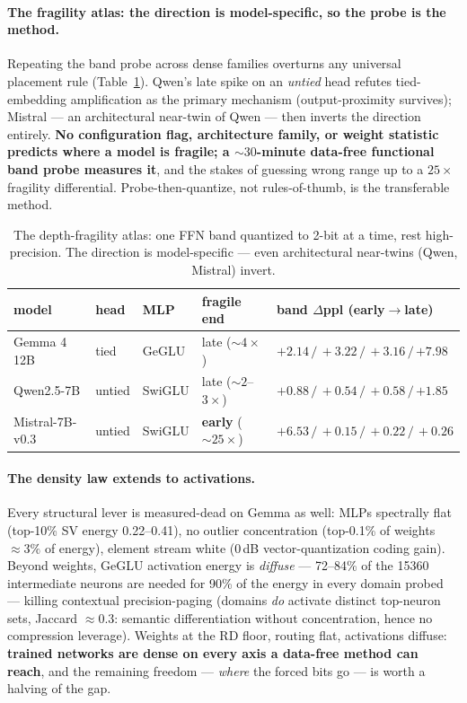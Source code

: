 \documentclass[10pt]{article}
\begin{document}
\paragraph{The fragility atlas: the direction is model-specific, so the probe is the method.}
Repeating the band probe across dense families overturns any universal placement rule
(Table~\ref{tab:atlas}). Qwen's late spike on an \emph{untied} head refutes tied-embedding amplification
as the primary mechanism (output-proximity survives); Mistral --- an architectural near-twin of Qwen ---
then inverts the direction entirely. \textbf{No configuration flag, architecture family, or weight
statistic predicts where a model is fragile; a ${\sim}30$-minute data-free functional band probe measures
it}, and the stakes of guessing wrong range up to a $25\times$ fragility differential.
Probe-then-quantize, not rules-of-thumb, is the transferable method.
\begin{table}[h]\centering\small
\begin{tabular}{lllll}
\toprule
model & head & MLP & fragile end & band $\Delta$ppl (early$\to$late) \\
\midrule
Gemma 4 12B & tied & GeGLU & late (${\sim}4\times$) & $+2.14\,/\,+3.22\,/\,+3.16\,/\,\mathbf{+7.98}$ \\
Qwen2.5-7B & untied & SwiGLU & late (${\sim}2$--$3\times$) & $+0.88\,/\,+0.54\,/\,+0.58\,/\,\mathbf{+1.85}$ \\
Mistral-7B-v0.3 & untied & SwiGLU & \textbf{early} (${\sim}25\times$) & $\mathbf{+6.53}\,/\,+0.15\,/\,+0.22\,/\,+0.26$ \\
\bottomrule
\end{tabular}
\caption{The depth-fragility atlas: one FFN band quantized to 2-bit at a time, rest high-precision. The
direction is model-specific --- even architectural near-twins (Qwen, Mistral) invert.}\label{tab:atlas}
\end{table}

\paragraph{The density law extends to activations.}
Every structural lever is measured-dead on Gemma as well: MLPs spectrally flat (top-10\% SV energy
0.22--0.41), no outlier concentration (top-0.1\% of weights ${\approx}3\%$ of energy), element stream
white (0\,dB vector-quantization coding gain). Beyond weights, GeGLU activation energy is \emph{diffuse}
--- 72--84\% of the 15360 intermediate neurons are needed for 90\% of the energy in every domain probed
--- killing contextual precision-paging (domains \emph{do} activate distinct top-neuron sets, Jaccard
${\approx}0.3$: semantic differentiation without concentration, hence no compression leverage). Weights at
the RD floor, routing flat, activations diffuse: \textbf{trained networks are dense on every axis a
data-free method can reach}, and the remaining freedom --- \emph{where} the forced bits go --- is worth a
halving of the gap.
\end{document}

